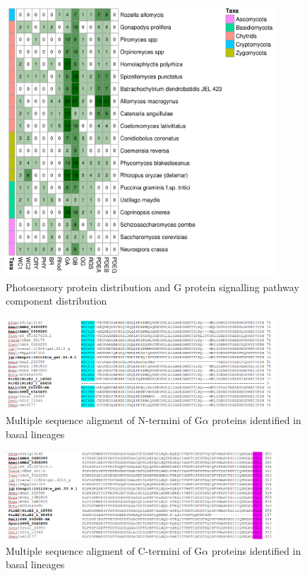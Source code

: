 
\begin{figure}[hb]
  \centering
  \includegraphics[width=4in]{./Chapter_RhodAux/img/photosenseHeatmap.png}
  \caption[Photosensory survey]{Photosensory protein distribution and G protein signalling pathway component distribution}
  \label{fig:ChRhodA_photosenseSurvey}
\end{figure}

\begin{figure}[hb]
  \centering
  \includegraphics[width=4in]{./Chapter_RhodAux/img/Ga_NtMSA.png}
  \caption[Galpha N-terminal MSA]{Multiple sequence aligment of N-termini of G$\alpha$ proteins identified in basal lineages}
  \label{fig:ChRhodA_gaNtMSA}
\end{figure}

\begin{figure}[hb]
  \centering
  \includegraphics[width=4in]{./Chapter_RhodAux/img/Ga_CtMSA.png}
  \caption[Galpha C-terminal MSA]{Multiple sequence aligment of C-termini of G$\alpha$ proteins identified in basal lineages}
  \label{fig:ChRhodA_gaCtMSA}
\end{figure}
